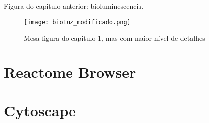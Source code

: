 Figura do capitulo anterior: bioluminescencia.

\begin{figure}[h]
\centering
\texttt{[image: bioLuz\_modificado.png]}
\caption{Mesa figura do capitulo 1, mas com maior nível de detalhes}
\label{terpenoidBackboneKEGG}
\end{figure}

\section{Reactome Browser}

\section{Cytoscape}

